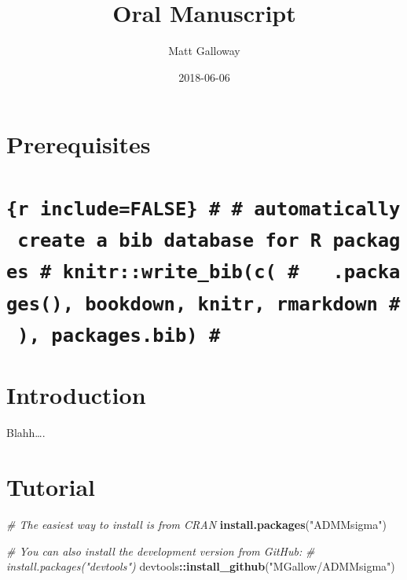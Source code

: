 \documentclass[12pt,]{book}
\title{Oral Manuscript}
\author{Matt Galloway}
\date{2018-06-06}
\newenvironment{Shaded}{\begin{snugshade}}{\end{snugshade}}
\newcommand{\CommentTok}[1]{\textcolor[rgb]{0.56,0.35,0.01}{\textit{#1}}}
\newcommand{\KeywordTok}[1]{\textcolor[rgb]{0.13,0.29,0.53}{\textbf{#1}}}
\newcommand{\NormalTok}[1]{#1}
\newcommand{\OperatorTok}[1]{\textcolor[rgb]{0.81,0.36,0.00}{\textbf{#1}}}
\newcommand{\StringTok}[1]{\textcolor[rgb]{0.31,0.60,0.02}{#1}}
\theoremstyle{definition}
\theoremstyle{definition}
\theoremstyle{definition}
\theoremstyle{remark}
\begin{document}
\maketitle

{
\hypersetup{linkcolor=}
\setcounter{tocdepth}{2}
\tableofcontents
}
\listoftables
\listoffigures
\hypertarget{prerequisites}{%
\chapter{Prerequisites}\label{prerequisites}}

\hypertarget{r-includefalse-automatically-create-a-bib-database-for-r-packages-knitrwrite_bibc-.packages-bookdown-knitr-rmarkdown-packages.bib}{%
\chapter{\texorpdfstring{\texttt{\{r\ include=FALSE\}\ \#\ \#\ automatically\ create\ a\ bib\ database\ for\ R\ packages\ \#\ knitr::write\_bib(c(\ \#\ \ \ .packages(),\ \textquotesingle{}bookdown\textquotesingle{},\ \textquotesingle{}knitr\textquotesingle{},\ \textquotesingle{}rmarkdown\textquotesingle{}\ \#\ ),\ \textquotesingle{}packages.bib\textquotesingle{})\ \#}}{\{r include=FALSE\} \# \# automatically create a bib database for R packages \# knitr::write\_bib(c( \#   .packages(), 'bookdown', 'knitr', 'rmarkdown' \# ), 'packages.bib') \#}}\label{r-includefalse-automatically-create-a-bib-database-for-r-packages-knitrwrite_bibc-.packages-bookdown-knitr-rmarkdown-packages.bib}}

\hypertarget{intro}{%
\chapter{Introduction}\label{intro}}

Blahh\ldots{}.

\hypertarget{tutorial}{%
\chapter{Tutorial}\label{tutorial}}

\vspace{0.5cm}

\begin{Shaded}
\begin{Highlighting}[]
\CommentTok{# The easiest way to install is from CRAN}
\KeywordTok{install.packages}\NormalTok{(}\StringTok{"ADMMsigma"}\NormalTok{)}

\CommentTok{# You can also install the development version from GitHub:}
\CommentTok{# install.packages("devtools")}
\NormalTok{devtools}\OperatorTok{::}\KeywordTok{install_github}\NormalTok{(}\StringTok{"MGallow/ADMMsigma"}\NormalTok{)}
\end{Highlighting}
\end{Shaded}
\end{document}
